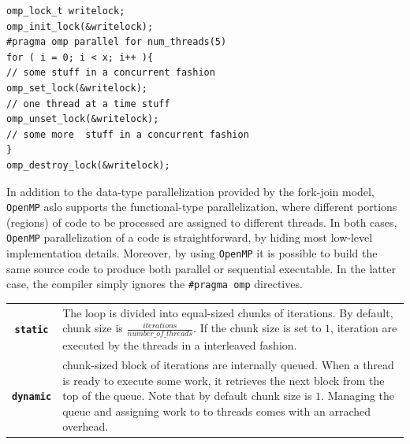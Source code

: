 \begin{description}
\begin{lstlisting}
omp_lock_t writelock;
omp_init_lock(&writelock);
#pragma omp parallel for num_threads(5)
for ( i = 0; i < x; i++ ){
// some stuff in a concurrent fashion
omp_set_lock(&writelock);
// one thread at a time stuff
omp_unset_lock(&writelock);
// some more  stuff in a concurrent fashion
}    
omp_destroy_lock(&writelock);
\end{lstlisting}
    

    In addition to the data-type parallelization provided by the
    fork-join model, \texttt{OpenMP} aslo supports the functional-type
    parallelization, where different portions (regions) of code to be
    processed are assigned to different threads. In both cases, \texttt{OpenMP}
    parallelization of a code is straightforward, by hiding most
    low-level implementation details. Moreover, by using \texttt{OpenMP} it is
    possible to build the same source code to produce both parallel or
    sequential executable. In the latter case, the compiler simply
    ignores the \texttt{\#pragma omp} directives.
    
    \begin{table}
    	
    	\begin{tabularx}{1.0\textwidth}{cX}
    		\rowcolor{gray!35}	
    		\heading{\textbf{Scheduling Kind}} &  \heading{\textbf{Description}} \\ \hline
    		\rowcolor{gray!15}
    		\texttt{\textbf{static}} & The loop is divided into equal-sized chunks of iterations. By default, chunk size is $\frac{iterations}{number\_of\_threads}$. If the chunk size is set to $1$, iteration are executed by the threads in a interleaved fashion.\\ \hline
    		\rowcolor{gray!5}
    		\texttt{\textbf{dynamic}} & chunk-sized block of iterations are internally queued. When a thread is ready to execute some work, it retrieves the next block  from the top of the queue. Note that by default chunk size is $1$. Managing the queue and assigning work to  to threads comes with an arrached overhead.\\ \hline
    		

\end{tabularx}
\end{table}
\end{description}
